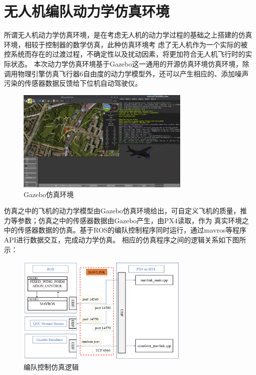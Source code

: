 \section{无人机编队动力学仿真环境}
所谓无人机动力学仿真环境，是在考虑无人机的动力学过程的基础之上搭建的仿真环境，相较于控制器的数学仿真，此种仿真环境考
虑了无人机作为一个实际的被控系统而存在的过渡过程，不确定性以及扰动因素，将更加符合无人机飞行时的实际状态。
本次动力学仿真环境基于Gazebo这一通用的开源仿真环境仿真环境，除调用物理引擎仿真飞行器6自由度的动力学模型外，还可以产生相应的、添加噪声
污染的传感器数据反馈给下位机自动驾驶仪。
\begin{figure}[H]
    \centering
    \includegraphics[width=0.75\textwidth]{figures/c4/Gazebo.png}
    \caption{Gazebo仿真环境}\label{fig:c4-Gazebo}
\end{figure}

仿真之中的飞机的动力学模型由Gazebo仿真环境给出，可自定义飞机的质量，推力等参数；仿真之中的传感器数据由Gazebo产生，由PX4读取，作为
真实环境之中的传感器数据的仿真。基于ROS的编队控制程序同时运行，通过mavros等程序API进行数据交互，完成动力学仿真。
相应的仿真程序之间的逻辑关系如下图所示：
\begin{figure}[H]
    \centering
    \includegraphics[width=0.75\textwidth]{figures/c4/px4_sitl_overview.png}
    \caption{编队控制仿真逻辑}\label{fig:px4_sitl_overview}
\end{figure}

